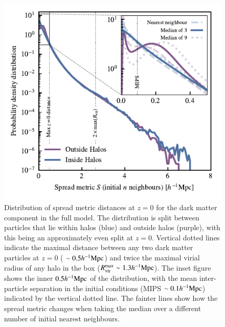 \begin{figure}
    \centering
    \includegraphics{figures/s50j7kAHF/dark_matter_distance_figure_s50j7k_AHF}
    \vspace{-0.5cm}
    \caption{%
    Distribution of spread metric distances at $z=0$ for the dark matter component 
     in the full \simba{} model. 
    The distribution is split between particles that lie within halos (blue) and outside halos (purple), with this being an approximately even
    split at $z=0$. Vertical dotted lines indicate the maximal distance
    between any two dark matter particles at $z=0$ ( 
    $\sim 0.5h^{-1}{\rm Mpc}{}$) and twice the maximal virial radius of any halo in the box ($R_{\rm vir}^{\rm max} \sim 1.3h^{-1}{\rm Mpc}{}$). 
    The inset figure shows the inner
    $0.5h^{-1}{\rm Mpc}{}$ of the distribution, 
    with the mean inter-particle separation in the initial conditions (MIPS $\sim 0.1h^{-1}{\rm Mpc}$) indicated by the vertical dotted line. The fainter lines show how the spread
    metric changes when taking the median over a different number of initial
    nearest neighbours.
    }
    \vspace{-0.5cm}
    \label{fig:dmonlyspread}
\end{figure}


